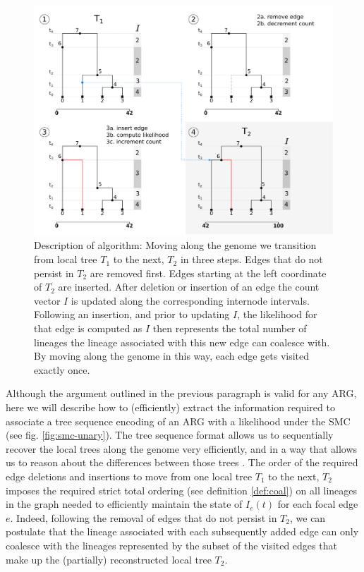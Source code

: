 \documentclass{article}
\begin{document}
\begin{figure}[!ht]
\centering
\includegraphics[width=\textwidth]{figures/ts_algo_2rows.png}
\caption{Description of algorithm: Moving along the genome we transition from
local tree $T_1$ to the next, $T_2$ in three steps.
Edges that do not persist in $T_2$ are
removed first. Edges starting at the left coordinate of $T_2$ are inserted.
After deletion or insertion of an edge the count vector $I$ is updated along the
corresponding internode intervals. Following an insertion, and prior to updating $I$,
the likelihood for that edge is computed as $I$ then represents the total number of
lineages the lineage associated with this new edge can
coalesce with. By moving along the genome in this way, each edge gets visited exactly once.}
\label{fig:algo}
\end{figure}

Although the argument outlined in the previous paragraph is valid for any ARG, here we
will describe how to (efficiently) extract the information required to associate a
tree sequence encoding of an ARG with a likelihood under the SMC (see fig. \ref{fig:smc-unary}).
The tree sequence format allows us to sequentially recover the local trees
along the genome very efficiently, and in a way that allows us to reason about
the differences between those trees \citep{kelleher_efficient_2016, ralph_efficiently_2020}.
The order of the required edge deletions and insertions to move from one local tree $T_1$ to
the next, $T_2$ imposes the required strict total ordering
(see definition \ref{def:coal}) on all
lineages in the graph needed to efficiently maintain the state of $I_e(t)$ for each focal edge $e$.
Indeed, following the removal of edges that do not persist in $T_2$,
we can postulate that the lineage associated with each subsequently added edge
can only coalesce with the lineages represented by the subset of the
visited edges that make up the (partially) reconstructed local tree $T_2$.
\end{document}
